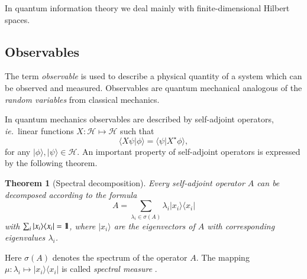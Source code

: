 \documentclass[final,3p,times]{elsarticle}
\newcommand{\ket}[1]{\ensuremath{|#1\rangle}}
\newcommand{\bra}[1]{\ensuremath{\langle#1|}}
\newcommand{\1}{{\rm 1\hspace{-0.9mm}l}}
\newcommand{\Id}{\1}
\newcommand{\HS}[1]{\ensuremath{\mathcal{#1}}} %
\newcommand{\ie}{\emph{ie.}}
\newcommand{\Observ}[1]{\ensuremath{#1}}
\newcommand{\Spectrum}[1]{\ensuremath{\sigma(#1)}}
\newcommand{\Spec}[1]{\Spectrum{#1}}
\newcommand{\ketbra}[2]{\ensuremath{\ket{#1}\bra{#2}}}
\newcommand{\proj}[1]{\ensuremath{\ketbra{#1}{#1}}}
\newcommand{\Proj}[1]{\proj{#1}}
\newcommand{\iner}[2]{\braket{#1}{#2}}
\newcommand{\Iner}[2]{\iner{#1}{#2}}
\newcommand{\braket}[2]{\ensuremath{\langle#1|#2\rangle}}
\newtheorem{theorem}{Theorem}
\begin{document}
In quantum information theory we deal mainly with finite-dimensional Hilbert
spaces.

\subsection{Observables}
The term \emph{observable} is used to describe a physical
quantity of a system which can be observed and measured. Observables are
quantum mechanical analogous of the \emph{random variables} from classical mechanics.

In quantum mechanics observables are described by self-adjoint operators,
\ie\ linear functions $X:\HS{H}\mapsto\HS{H}$ such that
\begin{equation}
\Iner{X\psi}{\phi}=\Iner{\psi}{X^\star\phi},
\label{eqn:selfadj}
\end{equation}
for any $\ket{\phi},\ket{\psi}\in\HS{H}$. An important property of self-adjoint
operators is expressed by the following theorem.

\begin{theorem}[Spectral decomposition]
Every self-adjoint operator $\Observ{A}$ can be decomposed according to the
formula
\begin{equation}
\Observ{A} = \sum_{\lambda_i\in\Spec{\Observ{A}}} \lambda_i\proj{x_i}
\end{equation}
with $\sum_i\Proj{x_i}=\Id$, where $\ket{x_i}$ are the eigenvectors of
$\Observ{A}$ with corresponding eigenvalues $\lambda_i$.
\end{theorem}
Here $\sigma(A)$ denotes the spectrum of the operator $A$. The mapping
$\mu:\lambda_i\mapsto \Proj{x_i}$ is called \emph{spectral
measure} \cite{mlak}.
\end{document}

